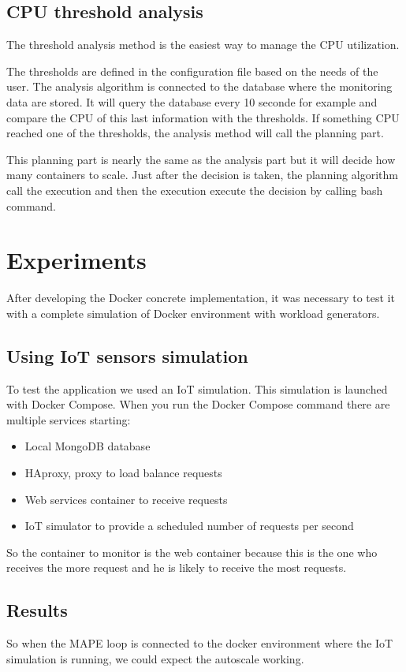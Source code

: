 \documentclass[11pt]{IEEEtran}
\begin{document}
\subsection{CPU threshold analysis}
The threshold analysis method is the easiest way to manage the CPU utilization. 

The thresholds are defined in the configuration file based on the needs of the user. The analysis algorithm is connected to the database where the monitoring data are stored. It will query the database every 10 seconde for example and compare the CPU of this last information with the thresholds. If something CPU reached one of the thresholds, the analysis method will call the planning part.

This planning part is nearly the same as the analysis part but it will decide how many containers to scale. Just after the decision is taken, the planning algorithm call the execution and then the execution execute the decision by calling bash command.

\section{Experiments}
After developing the Docker concrete implementation, it was necessary to test it with a complete simulation of Docker environment with workload generators.
\subsection{Using IoT sensors simulation}
To test the application we used an IoT simulation. This simulation is launched with Docker Compose. When you run the Docker Compose command there are multiple services starting: 
\begin{itemize}
 \item Local MongoDB database
 \item HAproxy, proxy to load balance requests
 \item Web services container to receive requests
 \item IoT simulator to provide a scheduled number of requests per second
\end{itemize}
So the container to monitor is the web container because this is the one who receives the more request and he is likely to receive the most requests.
\subsection{Results}
So when the MAPE loop is connected to the docker environment where the IoT simulation is running, we could expect the autoscale working. 
\end{document}
